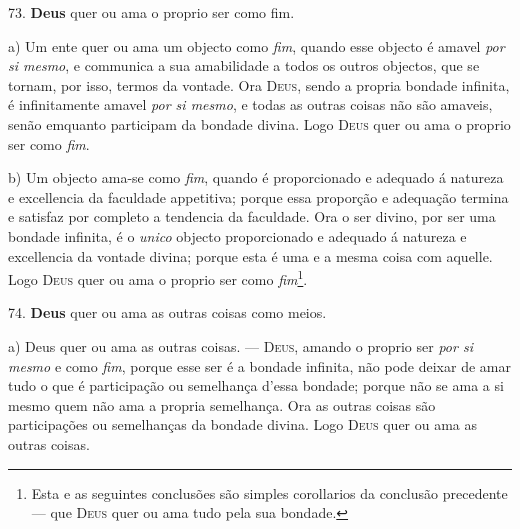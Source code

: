  73. \textbf{Deus} quer ou ama o proprio ser como fim.

a) Um ente quer ou ama um objecto como \emph{fim}, quando esse objecto é amavel \emph{por si mesmo}, e communica a sua amabilidade a todos os outros objectos, que se tornam, por isso, termos da vontade. Ora \textsc{Deus}, sendo a propria bondade infinita, é infinitamente amavel \emph{por si mesmo}, e todas as outras coisas não são amaveis, senão emquanto participam da bondade divina. Logo \textsc{Deus} quer ou ama o proprio ser como \emph{fim}.

b) Um objecto ama-se como \emph{fim}, quando é proporcionado e adequado á natureza e excellencia da faculdade appetitiva; porque essa proporção e adequação termina e satisfaz por completo a tendencia da faculdade. Ora o ser divino, por ser uma bondade infinita, é o \emph{unico} objecto proporcionado e adequado á natureza e excellencia da vontade divina; porque esta é uma e a mesma coisa com aquelle. Logo \textsc{Deus} quer ou ama o proprio ser como \emph{fim}\footnote{Esta e as seguintes conclusões são simples corollarios da conclusão precedente --- que \textsc{Deus} quer ou ama tudo pela sua bondade.}.

74. \textbf{Deus} quer ou ama as outras coisas como meios.

a) Deus quer ou ama as outras coisas. --- \textsc{Deus}, amando o proprio ser \emph{por si mesmo} e como \emph{fim}, porque esse ser é a bondade infinita, não pode deixar de amar tudo o que é participação ou semelhança d'essa bondade; porque não se ama a si mesmo quem não ama a propria semelhança. Ora as outras coisas são participações ou semelhanças da bondade divina. Logo \textsc{Deus} quer ou ama as outras coisas.

